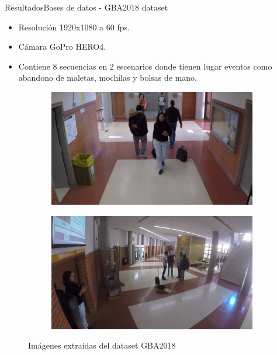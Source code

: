 
\begin{frame}{Resultados}{Bases de datos - GBA2018 dataset}

\begin{itemize}
    \justifying
    \item Resolución 1920x1080 a 60 fps.
    \item Cámara GoPro HERO4.
    \item Contiene 8 secuencias en 2 escenarios donde tienen lugar eventos como abandono de maletas, mochilas y bolsas de mano.
\end{itemize}

\vspace{0.1cm}

\begin{figure}[ht]
  \centering
  \begin{subfigure}[b]{0.4\textwidth}
    \includegraphics[width=\textwidth]{Images/resultados/datasets/GBA_3.jpg}
    \caption{}
    \label{fig:GBA_3}
  \end{subfigure}
  \qquad
  \begin{subfigure}[b]{0.4\textwidth}
    \includegraphics[width=\textwidth]{Images/resultados/datasets/GBA_2.jpg}
    \caption{}
    \label{fig:GBA_4}
  \end{subfigure}
  \caption{Imágenes extraídas del dataset GBA2018}
  \label{fig:GBA2018}
\end{figure}
    
\end{frame}

